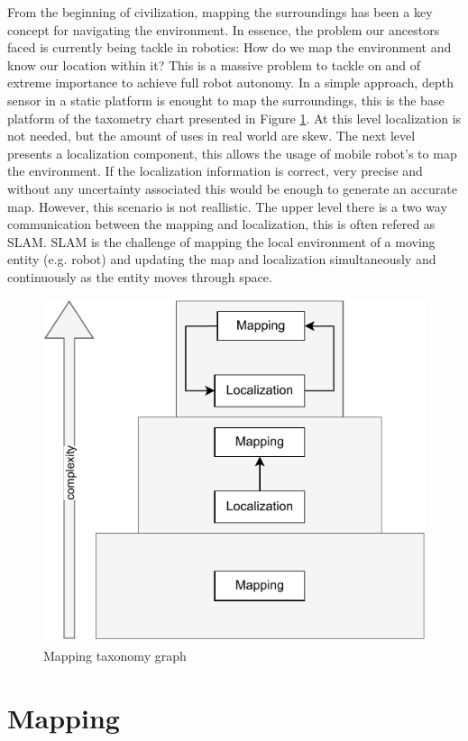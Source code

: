 
From the beginning of civilization, mapping the surroundings has been a key concept for navigating the environment. In essence, the problem our ancestors faced is currently being tackle in robotics: How do we map the environment and know our location within it? This is a massive problem to tackle on and of extreme importance to achieve full robot autonomy. In a simple approach, depth sensor in a static platform is enought to map the surroundings, this is the base platform of the taxometry chart presented in Figure \ref*{fig: taxonomy graph}. At this level localization is not needed, but the amount of uses in real world are skew. The next level presents a localization component, this allows the usage of mobile robot's to map the environment. If the localization information is correct, very precise and without any uncertainty associated this would be enough to generate an accurate map. However, this scenario is not reallistic. The upper level there is a two way communication between the mapping and localization, this is often refered as \acl*{SLAM}. \acs*{SLAM} is the challenge of mapping the local environment of a moving entity (e.g. robot) and updating the map and localization simultaneously and continuously as the entity moves through space.

\begin{figure}[H]
    \centering
    \includegraphics[width=0.4\linewidth]{images/background/mapping taxo.pdf}
    \caption{Mapping taxonomy graph}
    \label{fig: taxonomy graph}
\end{figure}


\section{Mapping}


